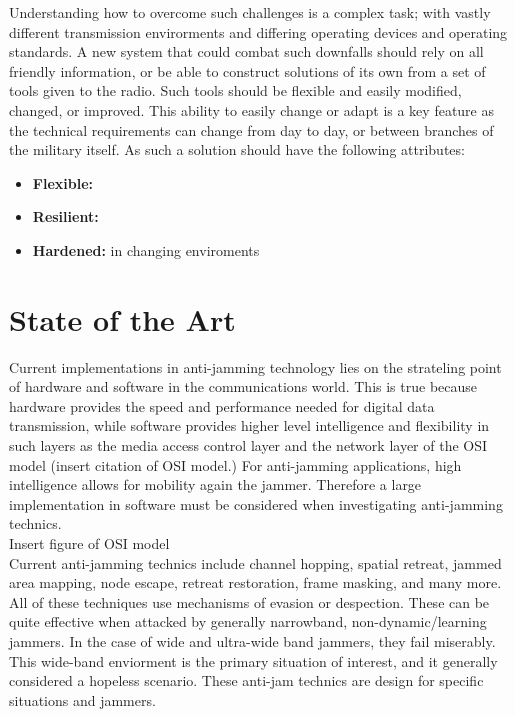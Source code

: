 \documentclass[11pt]{mvlthesis}
\begin{document}
Understanding how to overcome such challenges is a complex task; with vastly different transmission envirorments and differing operating devices and operating standards.  A new system that could combat such downfalls should rely on all friendly information, or be able to construct solutions of its own from a set of tools given to the radio.  Such tools should be flexible and easily modified, changed, or improved.  This ability to easily change or adapt is a key feature as the technical requirements can change from day to day, or between branches of the military itself. As such a solution should have the following attributes:

\begin{itemize}
\item \textbf{Flexible:}

\item \textbf{Resilient:}

\item \textbf{Hardened:} in changing enviroments

\end{itemize}


\section{State of the Art}

Current implementations in anti-jamming technology lies on the strateling point of hardware and software in the communications world.  This is true because hardware provides the speed and performance needed for digital data transmission, while software provides higher level intelligence and flexibility in such layers as the media access control layer and the network layer of the OSI model (insert citation of OSI model.)  For anti-jamming applications, high intelligence allows for mobility again the jammer.  Therefore a large implementation in software must be considered when investigating anti-jamming technics.\\

Insert figure of OSI model\\

Current anti-jamming technics include channel hopping, spatial retreat, jammed area mapping, node escape, retreat restoration, frame masking, and many more\cite{1}.  All of these techniques use mechanisms of evasion or despection.  These can be quite effective when attacked by generally narrowband, non-dynamic/learning jammers.  In the case of wide and ultra-wide band jammers, they fail miserably.  This wide-band enviorment is the primary situation of interest, and it generally considered a hopeless scenario.  These anti-jam technics are design for specific situations and jammers.\\
\end{document}
